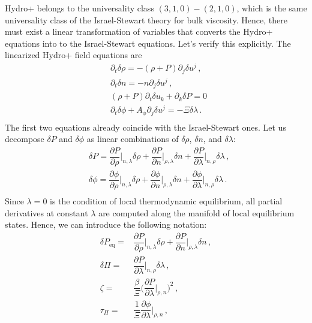 \documentclass[a4paper, amsfonts, amssymb, amsmath, reprint, showkeys, nofootinbib, twoside, onecolumn,notitlepage]{revtex4-1}
\begin{document}
Hydro+ belongs to the universality class $(3,1,0)-(2,1,0)$, which is the same universality class of the Israel-Stewart theory for bulk viscosity. Hence, there must exist a linear transformation of variables that converts the Hydro+ equations into to the Israel-Stewart equations. Let's verify this explicitly. The linearized Hydro+ field equations are
\begin{equation}\label{comebemybaby}
\begin{split}
& \partial_t \delta \rho = -(\rho+P)\partial_j \delta u^j \, , \\
& \partial_t \delta n = -n\partial_j \delta u^j \, , \\
&(\rho+P)\partial_t \delta u_k +\partial_k  \delta P =0 \, \\
& \partial_t \delta \phi+A_\phi \partial_j \delta u^j = -\Xi \delta \lambda \, . \\
\end{split}
\end{equation}
The first two equations already coincide with the Israel-Stewart ones. Let us decompose $\delta P$ and $\delta \phi$ as linear combinations of $\delta \rho$, $\delta n$, and $\delta \lambda$:
\begin{equation}
\begin{split}
& \delta P =\dfrac{\partial P}{\partial \rho}\bigg|_{n,\lambda} \delta \rho + \dfrac{\partial P}{\partial n}\bigg|_{\rho,\lambda} \delta n +\dfrac{\partial P}{\partial \lambda}\bigg|_{n,\rho} \delta \lambda \, , \\
& \delta \phi =\dfrac{\partial \phi}{\partial \rho}\bigg|_{n,\lambda} \delta \rho + \dfrac{\partial \phi}{\partial n}\bigg|_{\rho,\lambda} \delta n +\dfrac{\partial \phi}{\partial \lambda}\bigg|_{n,\rho} \delta \lambda \, . \\
\end{split}
\end{equation}
Since $\lambda=0$ is the condition of local thermodynamic equilibrium, all partial derivatives at constant $\lambda$ are computed along the manifold of local equilibrium states. Hence, we can introduce the following notation:
\begin{equation}\label{hydro+tobulki}
\begin{split}
 \delta P_{\text{eq}} ={}& \dfrac{\partial P}{\partial \rho}\bigg|_{n,\lambda} \delta \rho + \dfrac{\partial P}{\partial n}\bigg|_{\rho,\lambda} \delta n  \, , \\
\delta \Pi ={}& \dfrac{\partial P}{\partial \lambda}\bigg|_{n,\rho} \delta \lambda \, , \\
\zeta ={}& \dfrac{\beta}{\Xi} \bigg( \dfrac{\partial P}{\partial \lambda}\bigg|_{\rho,n} \bigg)^2 \, , \\
\tau_\Pi ={}& \dfrac{1}{\Xi} \dfrac{\partial \phi}{\partial \lambda} \bigg|_{\rho,n} \, , \\
\end{split}
\end{equation}
\end{document}
